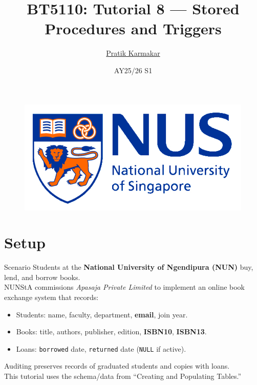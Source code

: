 \documentclass{beamer}
\author{\href{https://pratik2358.github.io/}{Pratik Karmakar}}
\title{BT5110: Tutorial 8 — Stored Procedures and Triggers}
\institute{
  School of Computing,\\
  National University of Singapore
}
\date{AY25/26 S1}
\begin{document}
\begin{frame}
  \titlepage
  \begin{figure}[htpb]
    \begin{center}
      \includegraphics[keepaspectratio, scale=0.18]{nus-logo.png}
    \end{center}
  \end{figure}
\end{frame}

\section{Setup}
\begin{frame}{Scenario}
\small
Students at the \textbf{National University of Ngendipura (NUN)} buy, lend, and borrow books.\\
NUNStA commissions \emph{Apasaja Private Limited} to implement an online book exchange system that records:
\begin{itemize}\itemsep3pt
  \item Students: name, faculty, department, \textbf{email}, join year.
  \item Books: title, authors, publisher, edition, \textbf{ISBN10}, \textbf{ISBN13}.
  \item Loans: \texttt{borrowed} date, \texttt{returned} date (\texttt{NULL} if active).
\end{itemize}
Auditing preserves records of graduated students and copies with loans.\\
This tutorial uses the schema/data from “Creating and Populating Tables.”
\end{frame}
\end{document}
